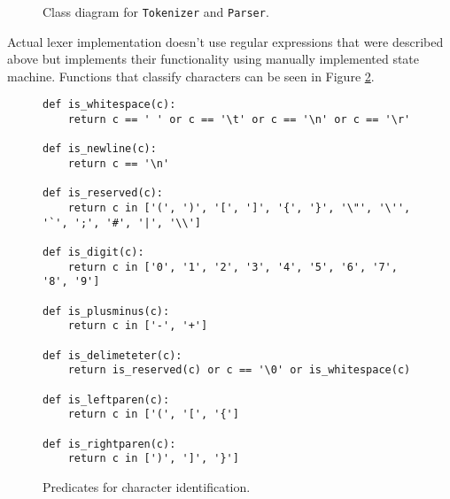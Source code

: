 \begin{figure}[h]
	\centering
\caption{Class diagram for \texttt{Tokenizer} and \texttt{Parser}.}
\label{class-diagram-lexer-parser}
\end{figure}

Actual lexer implementation doesn't use regular expressions that were described above but implements their functionality using manually implemented state machine. Functions that classify characters can be seen in Figure \ref{char-predicates}.

\begin{figure}[h]
\begin{verbatim}
def is_whitespace(c):
    return c == ' ' or c == '\t' or c == '\n' or c == '\r'

def is_newline(c):
    return c == '\n'

def is_reserved(c): 
    return c in ['(', ')', '[', ']', '{', '}', '\"', '\'', '`', ';', '#', '|', '\\']

def is_digit(c):
    return c in ['0', '1', '2', '3', '4', '5', '6', '7', '8', '9']

def is_plusminus(c):
    return c in ['-', '+']

def is_delimeteter(c):
    return is_reserved(c) or c == '\0' or is_whitespace(c)

def is_leftparen(c):
	return c in ['(', '[', '{']

def is_rightparen(c):
	return c in [')', ']', '}']
\end{verbatim}
\caption{Predicates for character identification.}
\label{char-predicates}
\end{figure}


